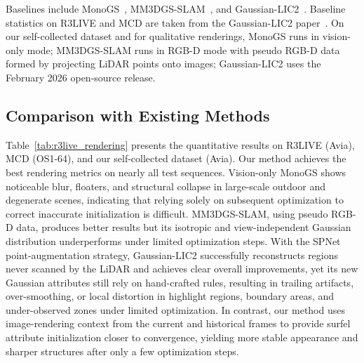 \documentclass[letterpaper,journal]{IEEEtran}
\begin{document}
Baselines include MonoGS~\cite{matsuki2024gaussian}, MM3DGS-SLAM~\cite{sun2024mm3dgs}, and Gaussian-LIC2~\cite{lang2025gaussianlic2}. Baseline statistics on R3LIVE and MCD are taken from the Gaussian-LIC2 paper~\cite{lang2025gaussianlic2}. On our self-collected dataset and for qualitative renderings, MonoGS runs in vision-only mode; MM3DGS-SLAM runs in RGB-D mode with pseudo RGB-D data formed by projecting LiDAR points onto images; Gaussian-LIC2 uses the February 2026 open-source release.

\subsection{Comparison with Existing Methods}

Table~\ref{tab:r3live_rendering} presents the quantitative results on R3LIVE (Avia), MCD (OS1-64), and our self-collected dataset (Avia). Our method achieves the best rendering metrics on nearly all test sequences. Vision-only MonoGS shows noticeable blur, floaters, and structural collapse in large-scale outdoor and degenerate scenes, indicating that relying solely on subsequent optimization to correct inaccurate initialization is difficult. MM3DGS-SLAM, using pseudo RGB-D data, produces better results but its isotropic and view-independent Gaussian distribution underperforms under limited optimization steps. With the SPNet point-augmentation strategy, Gaussian-LIC2 successfully reconstructs regions never scanned by the LiDAR and achieves clear overall improvements, yet its new Gaussian attributes still rely on hand-crafted rules, resulting in trailing artifacts, over-smoothing, or local distortion in highlight regions, boundary areas, and under-observed zones under limited optimization. In contrast, our method uses image-rendering context from the current and historical frames to provide surfel attribute initialization closer to convergence, yielding more stable appearance and sharper structures after only a few optimization steps.
\end{document}
